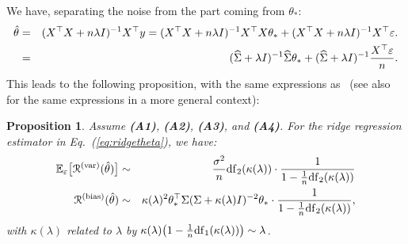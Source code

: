 \documentclass[11pt]{article}
\newcommand{\BEAS}{\begin{eqnarray*}}
\newcommand{\EEAS}{\end{eqnarray*}}
\newcommand{\BEA}{\begin{eqnarray}}
\newcommand{\EEA}{\end{eqnarray}}
\newcommand{\idm}{I}
\newtheorem{proposition}{Proposition}
\newcommand{\eq}[1]{Eq.~(\ref{eq:#1})}
\def \hS{ \widehat{ \Sigma} }
\def \S{  { \Sigma} }
\def \E{{\mathbb E}}
\begin{document}
We have, separating the noise from the part coming from $\theta_\ast$:
 \BEA
 \label{eq:ridgetheta}
 \hat{\theta} & = &  (X^\top X + n \lambda \idm)^{-1} X^\top y 
 = (X^\top X + n \lambda \idm)^{-1} X^\top X \theta_\ast + (X^\top X + n \lambda \idm)^{-1} X^\top \varepsilon.
 \\
\notag & = & 
 (\hS +   \lambda \idm)^{-1} \hS \theta_\ast + (\hS +  \lambda \idm)^{-1} \frac{X^\top \varepsilon}{n}.
 \EEA
 This leads to the following proposition, with the same expressions as~\cite[Theorem 4.13]{bartlett_montanari_rakhlin_2021} (see also~\cite{cheng2022dimension} for the same expressions in a more general context):
\begin{proposition}
Assume \textbf{(A1)}, \textbf{(A2)},  \textbf{(A3)}, and \textbf{(A4)}. For the ridge regression estimator in \eq{ridgetheta}, we have:
 \BEAS
 \E_\varepsilon \big[ \mathcal{R}^{({\rm var})}(\hat{\theta}) \big]
 & \sim & 
  \frac{\sigma^2}{n}  {\rm df}_2(\kappa(\lambda))
 \cdot
  \frac{1}{1 - \frac{1}{n}  {\rm df}_2(\kappa(\lambda))}
\\
 \mathcal{R}^{({\rm bias})}(\hat{\theta}) 
   & \sim & \kappa(\lambda)^2 \theta_\ast ^\top \S ( \S + \kappa(\lambda) \idm)^{-2} \theta_\ast 
 \cdot   \frac{1}{1 - \frac{1}{n}  {\rm df}_2(\kappa(\lambda))},
 \EEAS
with $\kappa(\lambda) $ related to $\lambda$ by $\kappa(\lambda) \big( 1 - \frac{1}{n} {\rm df}_1(\kappa(\lambda)) \big) \sim \lambda$.
\end{proposition} 
\end{document}

